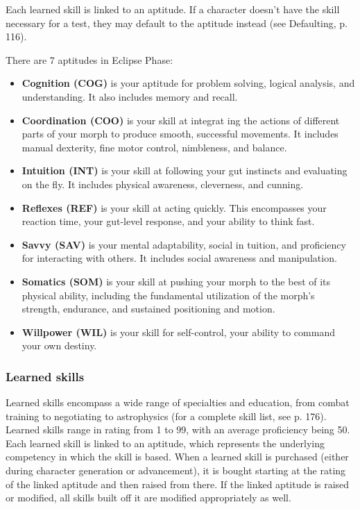 Each learned skill is linked to an aptitude. If a character doesn't
have the skill necessary for a test, they may default to the aptitude
instead (see Defaulting, p. 116).

There are 7 aptitudes in Eclipse Phase:

\begin{itemize}
\item \textbf{Cognition (COG)} is your aptitude for problem solving,
  logical analysis, and understanding. It also includes memory and
  recall.
\item \textbf{Coordination (COO)} is your skill at integrat ing the
  actions of different parts of your morph to produce smooth,
  successful movements. It includes manual dexterity, fine motor
  control, nimbleness, and balance.
\item \textbf{Intuition (INT)} is your skill at following your gut
  instincts and evaluating on the fly. It includes physical awareness,
  cleverness, and cunning.
\item \textbf{Reflexes (REF)} is your skill at acting quickly. This
  encompasses your reaction time, your gut-level response, and your
  ability to think fast.
\item \textbf{Savvy (SAV)} is your mental adaptability, social in
  tuition, and proficiency for interacting with others.  It includes
  social awareness and manipulation.
\item \textbf{Somatics (SOM)} is your skill at pushing your morph to
  the best of its physical ability, including the fundamental
  utilization of the morph's strength, endurance, and sustained
  positioning and motion.
\item \textbf{Willpower (WIL)} is your skill for self-control, your
  ability to command your own destiny.
\end{itemize}

\subsubsection{Learned skills}
\label{sec:learned-skills}

Learned skills encompass a wide range of specialties and education,
from combat training to negotiating to astrophysics (for a complete
skill list, see p. 176).  Learned skills range in rating from 1 to 99,
with an average proficiency being 50. Each learned skill is linked to
an aptitude, which represents the underlying competency in which the
skill is based. When a learned skill is purchased (either during
character generation or advancement), it is bought starting at the
rating of the linked aptitude and then raised from there. If the
linked aptitude is raised or modified, all skills built off it are
modified appropriately as well.

